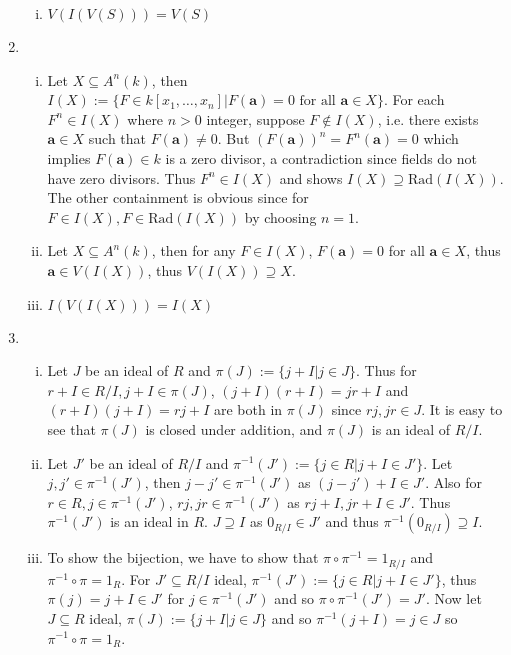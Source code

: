 \documentclass[a4paper,10pt]{article}
\theoremstyle{definition}
\begin{document}
\begin{enumerate}[1.]
\begin{enumerate}[(i)]
\item $V(I(V(S))) = V(S)$
\end{enumerate}
\item
\begin{enumerate}[(i)]
\item Let $X \subseteq A^n(k)$, then $I(X):=\{F \in k[x_1,\ldots,x_n]|F(\mathbf{a})=0 \text{ for all } \mathbf{a} \in X\}$. For each $F^n \in I(X)$ where $n>0$ integer, suppose $F \notin I(X)$, i.e. there exists $\mathbf{a} \in X $ such that $F(\mathbf{a}) \neq 0$. But $(F(\mathbf{a}))^n = F^n(\mathbf{a})=0$ which implies $F(\mathbf{a}) \in k$ is a zero divisor, a contradiction since fields do not have zero divisors. Thus $F^n \in I(X)$ and shows $I(X) \supseteq \text{Rad}(I(X))$. The other containment is obvious since for $F \in I(X), F \in\text{Rad}(I(X))$ by choosing $n=1$.

\item Let $X \subseteq A^n(k)$, then for any $F \in I(X)$, $F(\mathbf{a})=0$ for all $\mathbf{a} \in X$, thus $\mathbf{a} \in V(I(X))$, thus $V(I(X)) \supseteq X$.



\item $I(V(I(X))) = I(X)$
\end{enumerate}
\item
\begin{enumerate}[(i)]
\item Let $J$ be an ideal of $R$ and $\pi(J):=\{j + I | j \in J\}$. Thus for $r + I 
\in R/I, j+I \in \pi(J)$, $(j+I)(r+I) = jr +I$ and $(r+I)(j+I) = rj +I$ are both in $\pi(J)$ since $rj, jr \in J$. It is easy to see that $\pi(J)$ is closed under addition, and $\pi(J)$ is an ideal of $R/I$.

\item Let $J'$ be an ideal of $R/I$ and $\pi^{-1}(J'):=\{j \in R | j+I \in J'\}$. Let $j,j' \in \pi^{-1}(J')$, then $j-j' \in \pi^{-1}(J')$ as $(j-j') + I \in J'$. Also for $r \in R, j \in \pi^{-1}(J')$, $rj, jr \in \pi^{-1}(J')$ as $rj +I, jr +I \in J'$. Thus $\pi^{-1}(J')$ is an ideal in $R$. $J \supseteq I$ as $0_{R/I} \in J'$ and thus $\pi^{-1}(0_{R/I}) \supseteq I$.

\item To show the bijection, we have to show that $\pi \circ \pi^{-1} = 1_{R/I}$ and $\pi^{-1} \circ \pi = 1_{R}$. For $J' \subseteq R/I$ ideal, $\pi^{-1}(J'):=\{j \in R | j+I \in J'\}$, thus $\pi(j) = j+I \in J'$ for $j \in \pi^{-1}(J')$ and so $\pi \circ \pi^{-1}(J') =  J'$. Now let $J \subseteq R$ ideal, $\pi(J):=\{j+I|j\in J\}$ and so $\pi^{-1}(j+I)=j \in J$ so $\pi^{-1}\circ \pi = 1_R$.


\end{enumerate}
\end{enumerate}
\end{document}

